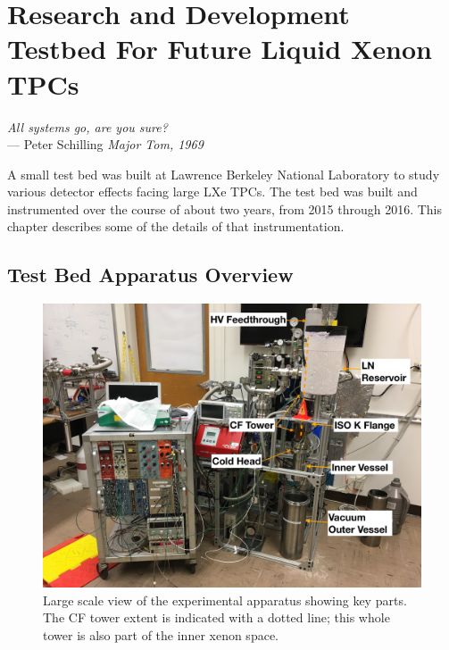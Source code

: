 \chapter{Research and Development Testbed For Future Liquid Xenon TPCs}

\label{ch:testbed} %

\begin{flushright}{\slshape    
  All systems go, are you sure? } \\ \medskip
    --- {Peter Schilling \textit{Major Tom, 1969}}
\end{flushright}


A small test bed was built at Lawrence Berkeley National Laboratory to study various detector effects facing large \ac{LXe} \ac{TPC}s. The test bed was built and instrumented over the course of about two years, from 2015 through 2016. This chapter describes some of the details of that instrumentation.

\section{Test Bed Apparatus Overview}

\begin{figure}[htbp]
\begin{center}
\includegraphics[width=\textwidth]{figures/testbed/apparatus.jpg}
\caption{Large scale view of the experimental apparatus showing key parts. The \acs{CF} tower extent is indicated with a dotted line; this whole tower is also part of the inner xenon space.}
\label{fig:apparatus}
\end{center}
\end{figure}

